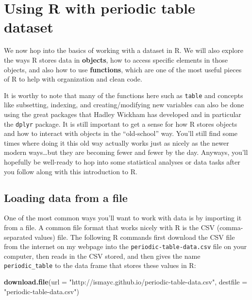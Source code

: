 \documentclass[]{tufte-book}
\newenvironment{Shaded}{\begin{snugshade}}{\end{snugshade}}
\newcommand{\KeywordTok}[1]{\textcolor[rgb]{0.13,0.29,0.53}{\textbf{{#1}}}}
\newcommand{\DataTypeTok}[1]{\textcolor[rgb]{0.13,0.29,0.53}{{#1}}}
\newcommand{\StringTok}[1]{\textcolor[rgb]{0.31,0.60,0.02}{{#1}}}
\newcommand{\NormalTok}[1]{{#1}}
\begin{document}
\section{Using R with periodic table
dataset}\label{using-r-with-periodic-table-dataset}

We now hop into the basics of working with a dataset in R. We will also
explore the ways R stores data in \textbf{objects}, how to access
specific elements in those objects, and also how to use
\textbf{functions}, which are one of the most useful pieces of R to help
with organization and clean code.

It is worthy to note that many of the functions here such as
\texttt{table} and concepts like subsetting, indexing, and
creating/modifying new variables can also be done using the great
packages that Hadley Wickham has developed and in particular the
\texttt{dplyr} package. It is still important to get a sense for how R
stores objects and how to interact with objects in the ``old-school''
way. You'll still find some times where doing it this old way actually
works just as nicely as the newer modern ways\ldots{}but they are
becoming fewer and fewer by the day. Anyways, you'll hopefully be
well-ready to hop into some statistical analyses or data tasks after you
follow along with this introduction to R.

\subsection{Loading data from a file}\label{loading-data-from-a-file}

One of the most common ways you'll want to work with data is by
importing it from a file. A common file format that works nicely with R
is the CSV (comma-separated values) file. The following R commands first
download the CSV file from the internet on my webpage into the
\texttt{periodic-table-data.csv} file on your computer, then reads in
the CSV stored, and then gives the name \texttt{periodic\_table} to the
data frame that stores these values in R:

\begin{Shaded}
\begin{Highlighting}[]
\KeywordTok{download.file}\NormalTok{(}\DataTypeTok{url =} \StringTok{"http://ismayc.github.io/periodic-table-data.csv"}\NormalTok{, }
  \DataTypeTok{destfile =} \StringTok{"periodic-table-data.csv"}\NormalTok{)}
\end{Highlighting}
\end{Shaded}
\end{document}
